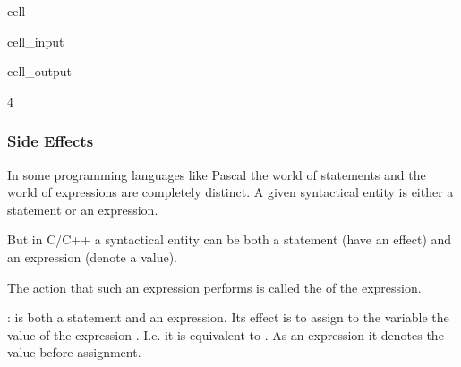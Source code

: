 \documentclass[a4paper,10pt,english]{jupyterBook}
\begin{document}
\begin{sphinxuseclass}{cell}\begin{sphinxVerbatimInput}

\begin{sphinxuseclass}{cell_input}
\begin{sphinxVerbatim}[commandchars=\\\{\}]
\end{sphinxVerbatim}

\end{sphinxuseclass}\end{sphinxVerbatimInput}
\begin{sphinxVerbatimOutput}

\begin{sphinxuseclass}{cell_output}
\begin{sphinxVerbatim}[commandchars=\\\{\}]
4
\end{sphinxVerbatim}

\end{sphinxuseclass}\end{sphinxVerbatimOutput}

\end{sphinxuseclass}

\subsubsection{Side Effects}
\label{\detokenize{text/progtut/statements:side-effects}}
\sphinxAtStartPar
In some programming languages like Pascal the world of statements and the world of expressions are completely distinct. A given syntactical entity is either a statement or an expression.

\sphinxAtStartPar
But in C/C++ a syntactical entity can be both a statement (have an effect) and an expression (denote a value).

\sphinxAtStartPar
The action that such an expression performs is called the  of the expression.

\sphinxAtStartPar
{}:  is both a statement and an expression. Its effect is to assign to the variable  the value of the expression . I.e. it is equivalent to . As an expression it denotes the value  before assignment.
\end{document}
